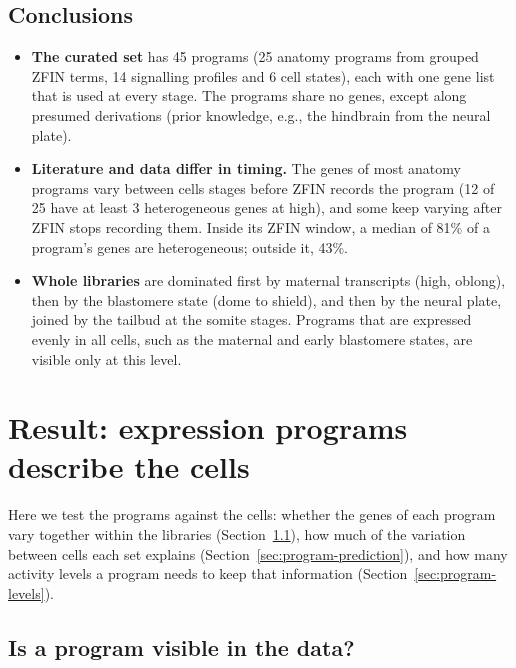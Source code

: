 \documentclass[11pt,a4paper]{article}
\begin{document}
\subsection{Conclusions}

\begin{itemize}
	\item \textbf{The curated set} has 45 programs (25 anatomy programs from grouped ZFIN terms, 14 signalling profiles and 6 cell states), each with one gene list that is used at every stage. The programs share no genes, except along presumed derivations (prior knowledge, e.g., the hindbrain from the neural plate).
	\item \textbf{Literature and data differ in timing.} The genes of most anatomy programs vary between cells stages before ZFIN records the program (12 of 25 have at least 3 heterogeneous genes at high), and some keep varying after ZFIN stops recording them. Inside its ZFIN window, a median of 81\% of a program's genes are heterogeneous; outside it, 43\%.
	\item \textbf{Whole libraries} are dominated first by maternal transcripts (high, oblong), then by the blastomere state (dome to shield), and then by the neural plate, joined by the tailbud at the somite stages. Programs that are expressed evenly in all cells, such as the maternal and early blastomere states, are visible only at this level.
\end{itemize}

\section{Result: expression programs describe the cells}
\label{sec:program-tests}

Here we test the programs against the cells: whether the genes of each program vary together within the libraries (Section~\ref{sec:program-support}), how much of the variation between cells each set explains (Section~\ref{sec:program-prediction}), and how many activity levels a program needs to keep that information (Section~\ref{sec:program-levels}).

\subsection{Is a program visible in the data?}
\label{sec:program-support}
\end{document}

